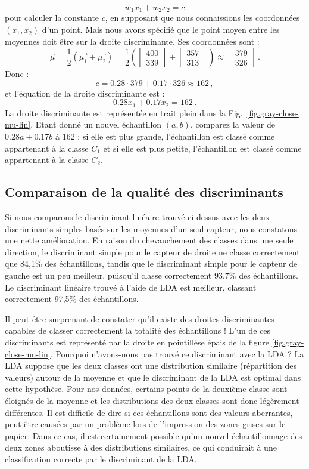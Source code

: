 \[
w_1x_1 + w_2x_2 = c
\]
pour calculer la constante $c$, en supposant que nous connaissions les coordonnées $(x_1,x_2)$ d'un point. Mais nous avons spécifié que le point moyen entre les moyennes doit être sur la droite discriminante. Ses coordonnées sont :
\[
\vec{\mu} = \frac{1}{2}(\vec{\mu_1} + \vec{\mu_2}) = \frac{1}{2}\left( \left[ \begin{array}{c} 400\\339 \end{array}\right] + \left[ \begin{array}{c} 357\\313 \end{array}\right] \right) \approx \left[ \begin{array}{c} 379\\326 \end{array}\right]\,.
\]
Donc :
\[
c = 0.28 \cdot 379 + 0.17\cdot 326 \approx 162\,,
\]
et l'équation de la droite discriminante est :
\[
0.28 x_1 + 0.17 x_2 = 162\,.
\]
La droite discriminante est représentée en trait plein dans la Fig.~\ref{fig.gray-close-mu-lin}. Etant donné un nouvel échantillon $(a,b)$, comparez la valeur de $0.28a + 0.17b$ à $162$ : si elle est plus grande, l'échantillon est classé comme appartenant à la classe $C_1$ et si elle est plus petite, l'échantillon est classé comme appartenant à la classe $C_2$. 

\subsection{Comparaison de la qualité des discriminants}

Si nous comparons le discriminant linéaire trouvé ci-dessus avec les deux discriminants simples basés sur les moyennes d'un seul capteur, nous constatons une nette amélioration. En raison du chevauchement des classes dans une seule direction, le discriminant simple pour le capteur de droite ne classe correctement que 84,1\% des échantillons, tandis que le discriminant simple pour le capteur de gauche est un peu meilleur, puisqu'il classe correctement 93,7\% des échantillons. Le discriminant linéaire trouvé à l'aide de LDA est meilleur, classant correctement 97,5\% des échantillons.

Il peut être surprenant de constater qu'il existe des droites discriminantes capables de classer correctement la totalité des échantillons ! L'un de ces discriminants est représenté par la droite en pointillése épais de la figure \ref{fig.gray-close-mu-lin}. Pourquoi n'avons-nous pas trouvé ce discriminant avec la LDA ? La LDA suppose que les deux classes ont une distribution similaire (répartition des valeurs) autour de la moyenne et que le discriminant de la LDA est optimal dans cette hypothèse. Pour nos données, certains points de la deuxième classe sont éloignés de la moyenne et les distributions des deux classes sont donc légèrement différentes. Il est difficile de dire si ces échantillons sont des valeurs aberrantes, peut-être causées par un problème lors de l'impression des zones grises sur le papier. Dans ce cas, il est certainement possible qu'un nouvel échantillonnage des deux zones aboutisse à des distributions similaires, ce qui conduirait à une classification correcte par le discriminant de la LDA.

